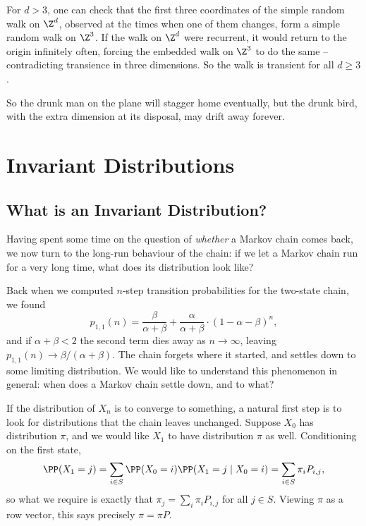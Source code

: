 \documentclass[a4paper]{scrartcl}
\begin{document}
\begin{remark}
	For $d > 3$, one can check that the first three coordinates of the simple random walk on $\Z^d$, observed at the times when one of them changes, form a simple random walk on $\Z^3$. If the walk on $\Z^d$ were recurrent, it would return to the origin infinitely often, forcing the embedded walk on $\Z^3$ to do the same -- contradicting transience in three dimensions. So the walk is transient for all $d \geq 3$.
\end{remark}

So the drunk man on the plane will stagger home eventually, but the drunk bird, with the extra dimension at its disposal, may drift away forever.

\section{Invariant Distributions}

\subsection{What is an Invariant Distribution?}

Having spent some time on the question of \emph{whether} a Markov chain comes back, we now turn to the long-run behaviour of the chain: if we let a Markov chain run for a very long time, what does its distribution look like?

Back when we computed $n$-step transition probabilities for the two-state chain, we found
$$
p_{1, 1}(n) = \frac{\beta}{\alpha+\beta}+\frac{\alpha}{\alpha+\beta} \cdot(1-\alpha-\beta)^{n},
$$
and if $\alpha + \beta < 2$ the second term dies away as $n \to \infty$, leaving $p_{1, 1}(n) \rightarrow \beta/(\alpha + \beta)$. The chain forgets where it started, and settles down to some limiting distribution. We would like to understand this phenomenon in general: when does a Markov chain settle down, and to what?

If the distribution of $X_n$ is to converge to something, a natural first step is to look for distributions that the chain leaves unchanged. Suppose $X_0$ has distribution $\pi$, and we would like $X_1$ to have distribution $\pi$ as well. Conditioning on the first state,
$$
\PP(X_1 = j) = \sum_{i \in S} \PP(X_0 = i)\PP(X_1 = j \mid X_0 = i) = \sum_{i \in S} \pi_i P_{i, j},
$$
so what we require is exactly that $\pi_j = \sum_{i} \pi_i P_{i, j}$ for all $j \in S$. Viewing $\pi$ as a row vector, this says precisely $\pi = \pi P$.
\end{document}
